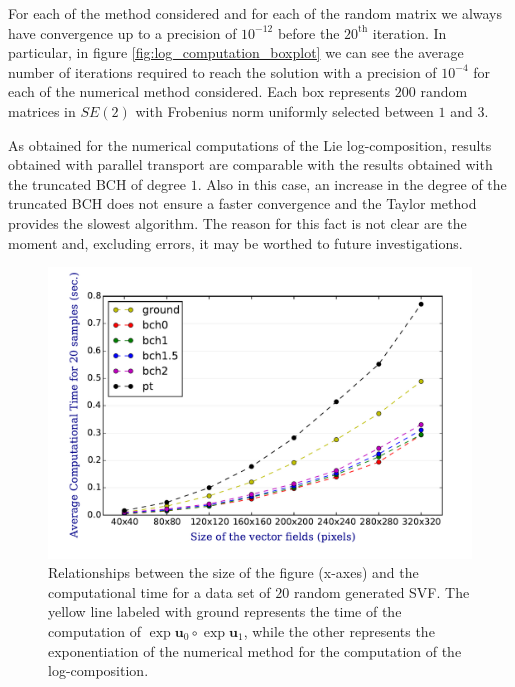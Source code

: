 For each of the method considered and for each of the random matrix we always have convergence up to a precision of $10^{-12}$ before the $20^{\text{th}}$ iteration.
In particular, in figure \ref{fig:log_computation_boxplot} we can see the average number of iterations required to reach the solution with a precision of $10^{-4}$ for each of the numerical method considered. Each box represents $200$ random matrices in $SE(2)$ with Frobenius norm uniformly selected between $1$ and $3$.

As obtained for the numerical computations of the Lie log-composition, results obtained with parallel transport are comparable with the results obtained with the truncated BCH of degree $1$. Also in this case, an increase in the degree of the truncated BCH does not ensure a faster convergence and the Taylor method provides the slowest algorithm. The reason for this fact is not clear are the moment and, excluding errors, it may be worthed to future investigations.



\begin{figure}[!ht]
	\includegraphics[scale=0.7]{figures/svf_computational_time.pdf}
	\caption{Relationships between the size of the figure (x-axes) and the computational time for a data set of $20$ random generated SVF. The yellow line labeled with ground represents the time of the computation of $\exp{\mathbf{u}_0}\circ \exp{\mathbf{u}_1}$, while the other represents the exponentiation of the numerical method for the computation of the log-composition.}
	\label{fig:svf_computational_time}
\end{figure}

